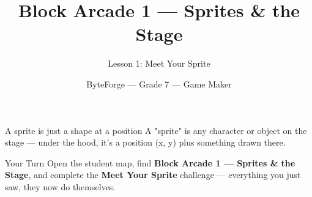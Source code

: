 \documentclass[aspectratio=169]{beamer}
\title{Block Arcade 1 — Sprites \& the Stage}
\subtitle{Lesson 1: Meet Your Sprite}
\author{ByteForge --- Grade 7 --- Game Maker}
\date{}
\begin{document}
\begin{frame}
    \titlepage
\end{frame}

\begin{frame}{A sprite is just a shape at a position}
    \Large
    A "sprite" is any character or object on the stage — under the hood, it's a position (x, y) plus something drawn there.

    \begin{center}
    \end{center}
\end{frame}

\begin{frame}{Your Turn}
    \Large
    Open the student map, find \textbf{Block Arcade 1 — Sprites \& the Stage}, and complete
    the \textbf{Meet Your Sprite} challenge --- everything you just saw, they now do themselves.
\end{frame}
\end{document}

